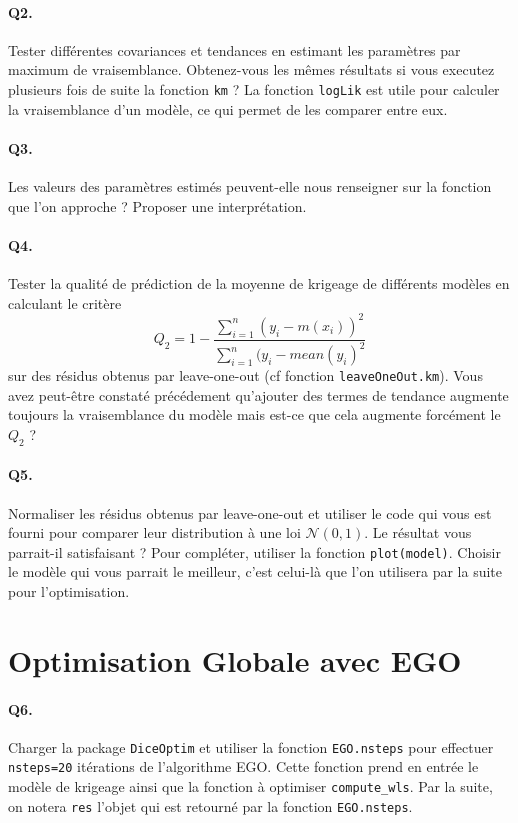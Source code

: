 \documentclass[12pt]{scrartcl}
\begin{document}
\paragraph{Q2.} Tester différentes covariances et tendances en estimant les paramètres par maximum de vraisemblance. Obtenez-vous les mêmes résultats si vous executez plusieurs fois de suite la fonction \texttt{km} ? La fonction \texttt{logLik} est utile pour calculer la vraisemblance d'un modèle, ce qui permet de les comparer entre eux.

\paragraph{Q3. } Les valeurs des paramètres estimés peuvent-elle nous renseigner sur la fonction que l'on approche ? Proposer une interprétation. 

\paragraph{Q4. } Tester la qualité de prédiction de la moyenne de krigeage de différents modèles en calculant le critère 
$$Q_2 = 1 - \frac{\sum_{i=1}^n (y_i - m(x_i))^2}{\sum_{i=1}^n (y_i - mean(y_i)^2}$$
sur des résidus obtenus par leave-one-out (cf fonction \texttt{leaveOneOut.km}). Vous avez peut-être constaté précédement qu'ajouter des termes de tendance augmente toujours la vraisemblance du modèle mais est-ce que cela augmente forcément le $Q_2$ ? 

\paragraph{Q5. } Normaliser les résidus obtenus par leave-one-out et utiliser le code qui vous est fourni pour comparer leur distribution à une loi $\mathcal{N}(0, 1)$. 
Le résultat vous parrait-il satisfaisant ? Pour compléter, utiliser la fonction \texttt{plot(model)}. Choisir le modèle qui vous parrait le meilleur, c'est celui-là que l'on utilisera par la suite pour l'optimisation.

\section{Optimisation Globale avec EGO}

\paragraph{Q6. } Charger la package \texttt{DiceOptim} et utiliser la fonction \texttt{EGO.nsteps} pour effectuer \texttt{nsteps=20} itérations de l'algorithme EGO. 
Cette fonction prend en entrée le modèle de krigeage ainsi que la fonction à optimiser \texttt{compute\_wls}. Par la suite, on notera \texttt{res} l'objet qui est retourné par la fonction \texttt{EGO.nsteps}.
\end{document}
